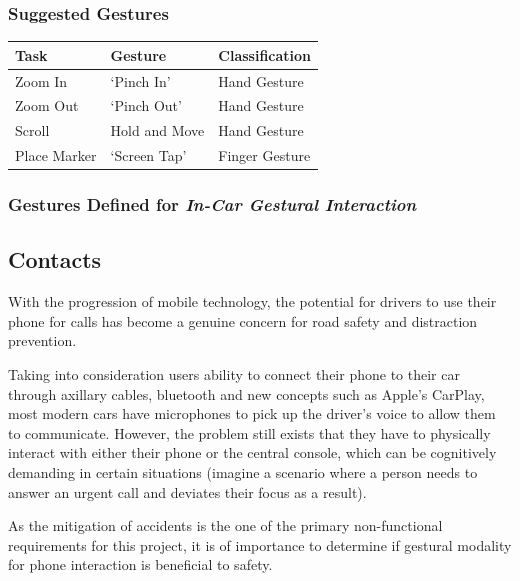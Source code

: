 \documentclass{l4proj}
\begin{document}
\subsubsection{Suggested Gestures}
\vspace{-3mm}
\begin{table}[h!]
\centering
    \begin{tabular}{|l|l|l|}
    \hline
    Task            & Gesture               & Classification \\ \hline
    Zoom In            & `Pinch In'          & Hand Gesture \\ \hline
    Zoom Out           & `Pinch Out'          & Hand Gesture \\ \hline
    Scroll       & Hold and Move           & Hand Gesture   \\ \hline
    Place Marker   & `Screen Tap'            & Finger Gesture   \\ \hline
    \end{tabular}
\end{table}

\subsubsection{Gestures Defined for \textbf{\textit{In-Car Gestural Interaction}}}

\subsection{Contacts}
\vspace{-3mm}
With the progression of mobile technology, the potential for drivers to use their phone for calls has become a genuine concern for road safety and distraction prevention.

Taking into consideration users ability to connect their phone to their car through axillary cables, bluetooth and new concepts such as Apple's CarPlay\cite{}, most modern cars have microphones to pick up the driver's voice to allow them to communicate. However, the problem still exists that they have to physically interact with either their phone or the central console, which can be cognitively demanding in certain situations (imagine a scenario where a person needs to answer an urgent call and deviates their focus as a result).

As the mitigation of accidents is the one of the primary non-functional requirements for this project, it is of importance to determine if gestural modality for phone interaction is beneficial to safety.
\end{document}
